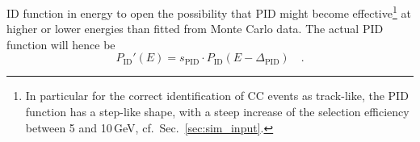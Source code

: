 \begin{description}
  ID function in energy to open the possibility that PID might become
  effective\footnote{In particular for the correct identification of \numu CC
  events as track-like, the PID function has a step-like shape, with a steep
  increase of the selection efficiency between 5 and 10\,GeV, cf.\
  Sec.~\ref{sec:sim_input}.} at higher or lower energies than fitted from
  Monte Carlo data. The actual PID function will hence be
  \begin{equation}
    P_\mathrm{ID}'(E) = s_\mathrm{PID}\cdot P_\mathrm{ID}(E-\Delta_\mathrm{PID})
      \quad.
  \end{equation}
\end{description}

